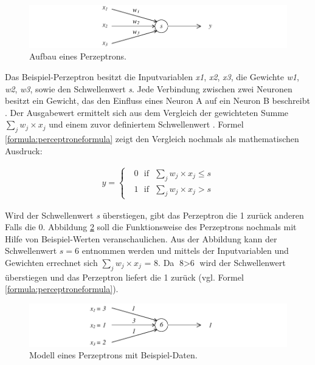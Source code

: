 \begin{figure}[ht]
\centering
\includegraphics{images/perceptron.pdf}
\caption{Aufbau eines Perzeptrons.}
\label{fig:perceptron}
\end{figure}

Das Beispiel-Perzeptron besitzt die Inputvariablen \textit{x1}, \textit{x2}, \textit{x3}, die Gewichte \textit{w1}, \textit{w2}, \textit{w3}, sowie den Schwellenwert \textit{s}. Jede Verbindung zwischen zwei Neuronen besitzt ein Gewicht, das den Einfluss eines Neuron A auf ein Neuron B beschreibt \cite [vgl. S. 86]{EA16}. Der Ausgabewert ermittelt sich aus dem Vergleich der gewichteten Summe $\sum_j w_{j}\times x_{j}$ und einem zuvor definiertem Schwellenwert \cite {HS99, LP87, WE16}. Formel \ref{formula:perceptroneformula} \cite {HS99, WE16} zeigt den Vergleich nochmals als mathematischen Ausdruck:

\begin{align}
\label{formula:perceptroneformula}
y = \begin{cases}\text{ }0\text{ }\text{if}\text{ }\sum_j w_{j}\times x_{j}\leq s\\\text{ }1\text{ }\text{if}\text{ }\sum_j w_{j}\times x_{j}> s\end{cases}
\end{align}

Wird der Schwellenwert \textit{s} überstiegen, gibt das Perzeptron die 1 zurück anderen Falls die 0. Abbildung \ref{fig:perceptronNumbered} soll die Funktionsweise des Perzeptrons nochmals mit Hilfe von Beispiel-Werten veranschaulichen. Aus der Abbildung kann der Schwellenwert $s=6$ entnommen werden und mittels der Inputvariablen und Gewichten errechnet sich $\sum_j w_{j}\times x_{j}\text{ = 8}$. Da $\text{8}>\text{6}$ wird der Schwellenwert überstiegen und das Perzeptron liefert die 1 zurück (vgl. Formel \ref{formula:perceptroneformula}). 

\begin{figure}[ht]
\centering
\includegraphics{images/perceptronNumbered.pdf}
\caption{Modell eines Perzeptrons mit Beispiel-Daten.}
\label{fig:perceptronNumbered}
\end{figure}

